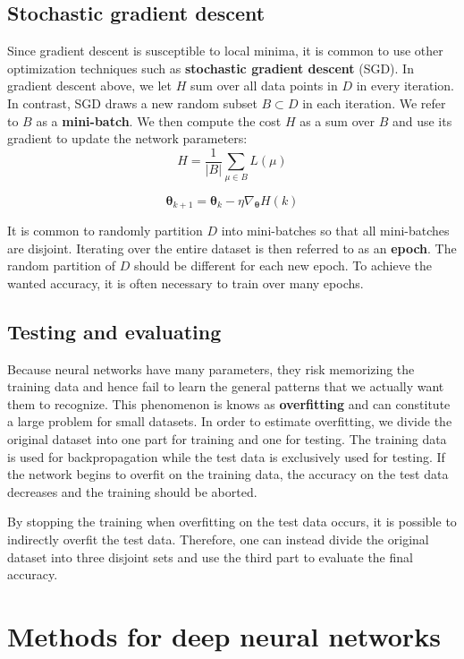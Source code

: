 \subsection{Stochastic gradient descent}

Since gradient descent is susceptible to local minima, it is common to use other optimization techniques such as \textbf{stochastic gradient descent} (SGD).
In gradient descent above, we let $H$ sum over all data points in $D$ in every iteration. In contrast, SGD draws a new random subset $B \subset D$ in each iteration. We refer to $B$ as a \textbf{mini-batch}. We then compute the cost $H$ as a sum over $B$ and use its gradient to update the network parameters:
\[
H = \frac{1}{\vert B \vert} \sum_{\mu \in B} L(\mu)
\]

\[
\mathbf{\theta}_{k+1} =
\mathbf{\theta}_k - \eta \nabla_{\mathbf{\theta}} H(k)
\]

It is common to randomly partition $D$ into mini-batches so that all mini-batches are disjoint. Iterating over the entire dataset is then referred to as an \textbf{epoch}.
The random partition of $D$ should be different for each new epoch.
To achieve the wanted accuracy, it is often necessary to train over many epochs.


\subsection{Testing and evaluating}

Because neural networks have many parameters, they risk memorizing the training data and hence fail to learn the general patterns that we actually want them to recognize.
This phenomenon is knows as \textbf{overfitting} and can constitute a large problem for small datasets. In order to estimate overfitting, we divide the original dataset into one part for training and one for testing. The training data is used for backpropagation while the test data is exclusively used for testing. If the network begins to overfit on the training data, the accuracy on the test data decreases and the training should be aborted.

By stopping the training when overfitting on the test data occurs, it is possible to indirectly overfit the test data. Therefore, one can instead divide the original dataset into three disjoint sets and use the third part to evaluate the final accuracy.

\newpage
\section{Methods for deep neural networks}

